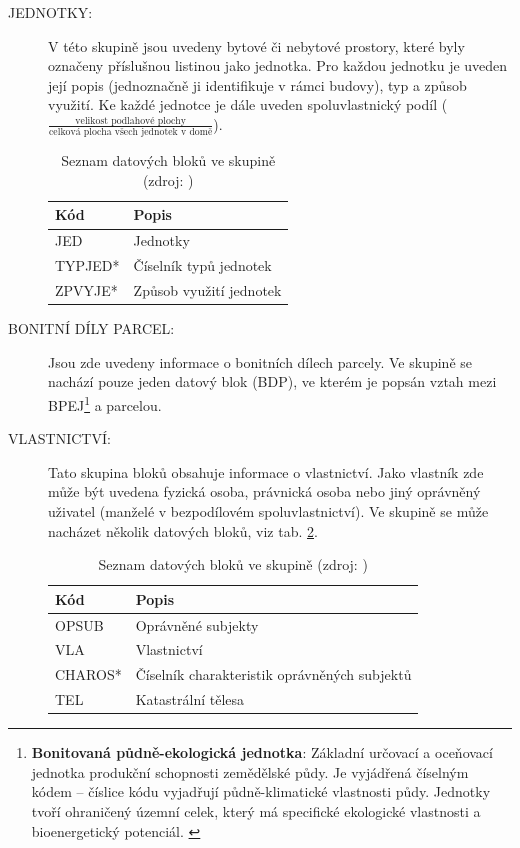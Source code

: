 \documentclass[a4paper,12pt,oneside]{book}
\begin{document}
\begin{description}
 \item[JEDNOTKY:] V této skupině jsou uvedeny bytové či nebytové prostory, které byly označeny příslušnou listinou jako jednotka. Pro každou jednotku je uveden její popis (jednoznačně ji identifikuje v rámci budovy), typ a způsob využití. Ke každé jednotce je dále uveden spoluvlastnický podíl ($\frac{\text{velikost podlahové plochy}}{\text{celková plocha všech jednotek v domě}}$). \cite{dp_landa}
 
 
\begin{table}[htbp]
\centering
\caption[Seznam datových bloků ve skupině ]{Seznam datových bloků ve skupině  (zdroj: \cite{vfk_struktura})}
\begin{tabular}{ll}
\toprule
\textbf{Kód} & \textbf{Popis} \\ 
\midrule
JED & Jednotky \\ 
TYPJED* & Číselník typů jednotek \\ 
ZPVYJE* & Způsob využití jednotek \\ 
\bottomrule
\end{tabular}
\label{t_skupina_jednotky}
\end{table}

 \newpage
 \item[BONITNÍ DÍLY PARCEL:] Jsou zde uvedeny informace o bonitních dílech parcely. Ve skupině se nachází pouze jeden datový blok (BDP), ve kterém je popsán vztah mezi BPEJ\footnote{\textbf{Bonitovaná půdně-ekologická jednotka}: Základní určovací a oceňovací jednotka produkční schopnosti zemědělské půdy. Je vyjádřená číselným kódem -- číslice kódu vyjadřují půdně-klimatické vlastnosti půdy. Jednotky tvoří ohraničený územní celek, který má specifické ekologické vlastnosti a bioenergetický potenciál. \cite{vugtk}} a parcelou. \cite{dp_landa}
 
 \item[VLASTNICTVÍ:] Tato skupina bloků obsahuje informace o vlastnictví. Jako vlastník zde může být uvedena fyzická osoba, právnická osoba nebo jiný oprávněný uživatel (manželé v bezpodílovém spoluvlastnictví). Ve skupině se může nacházet několik datových bloků, viz tab. \ref{t_skupina_vlastnictvi}. \cite{dp_landa}
 
\begin{table}[htbp]
\centering
\caption[Seznam datových bloků ve skupině ]{Seznam datových bloků ve skupině  (zdroj: \cite{vfk_struktura})}
\begin{tabular}{ll}
\toprule
\textbf{Kód} & \textbf{Popis} \\ 
\midrule
OPSUB & Oprávněné subjekty \\ 
VLA & Vlastnictví \\ 
CHAROS* & Číselník charakteristik oprávněných subjektů \\ 
TEL & Katastrální tělesa \\
\bottomrule
\end{tabular}
\label{t_skupina_vlastnictvi}
\end{table}


\end{description}
\end{document}
